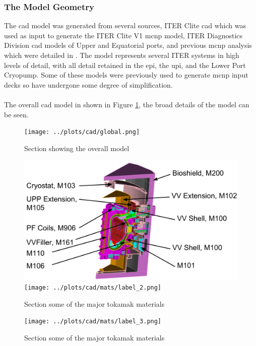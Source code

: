 \documentclass[12pt]{article}
\begin{document}
\subsubsection{The Model Geometry}
The \gls{cad} model was generated from several sources, ITER Clite \gls{cad}
which was used as input to generate the ITER Clite V1 \gls{mcnp} model, ITER
Diagnostics Division \gls{cad} models of Upper and Equatorial ports, and
previous \gls{mcnp} analysis which were detailed in \cite{cad_origination}. The
model represents several ITER systems in high levels of detail, with all detail
retained in the \gls{epi}, the  \gls{upi}, and the Lower Port Cryopump. Some of
these models were previously used to generate \gls{mcnp} input decks so have
undergone some degree of simplification.
\\
\\
The overall \gls{cad} model in shown in Figure \ref{fig:cad_iter_global}, the
broad details of the model can be seen. 
\begin{figure}[ht!]
  \centering
  \texttt{[image: ../plots/cad/global.png]}
  \caption{Section showing the overall model}
  \label{fig:cad_iter_global}
\end{figure}

\begin{figure}[p]
  \centering
  \includegraphics[scale=0.32]{../plots/cad/mats/label_1.png}
  \texttt{[image: ../plots/cad/mats/label\_2.png]}
  \caption{Section some of the major tokamak materials}
  \label{fig:material_assign_1}
\end{figure}

\begin{figure}[p]
  \centering
  \texttt{[image: ../plots/cad/mats/label\_3.png]}
  \caption{Section some of the major tokamak materials}
  \label{fig:material_assign_2}
\end{figure}
\end{document}
